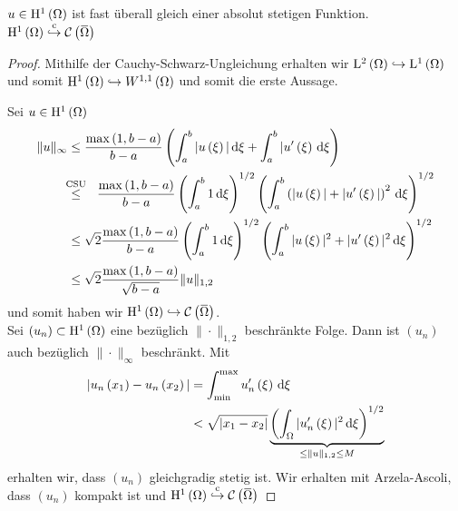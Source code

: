 \begin{lemma}[Satz]
	$u\in\mathrm{H}^{1}\left(\Omega\right)$ ist fast überall gleich einer absolut stetigen Funktion.\\
	$\H^{1}\left(\W\right)\cembed\C\left(\overbar{\W}\right)$
\end{lemma}
\begin{proof}
	Mithilfe der Cauchy-Schwarz-Ungleichung erhalten wir $\mathrm{L}^{2}\left(\Omega\right)\hookrightarrow\mathrm{L}^{1}\left(\Omega\right)$ und somit $\mathrm{H}^{1}\left(\Omega\right)\hookrightarrow W^{1,1}\left(\Omega\right)$ und somit die erste Aussage.
	
	Sei $u\in\mathrm{H}^{1}\left(\Omega\right)${}
	\begin{align*}
		\|u\|_{\infty} &\leq \frac{\operatorname{max}\left(1,b-a\right)}{b-a}\left(\int_{a}^{b}|u\left(\xi\right)|\d\xi + \int_{a}^{b}|u^{\prime}\left(\xi\right)\d\xi\right)\\
		&\overset{\mathclap{\text{CSU}}}{\leq} \hspace*{1em} \frac{\operatorname{max}\left(1,b-a\right)}{b-a}\left(\int_{a}^{b}1\d\xi\right)^{1/2}\left(\int_{a}^{b}\left(|u\left(\xi\right)|+|u^{\prime}\left(\xi\right)|\right)^{2}\d\xi\right)^{1/2}\\
		&\leq \sqrt{2}\frac{\operatorname{max}\left(1,b-a\right)}{b-a}\left(\int_{a}^{b}1\d\xi\right)^{1/2}\left(\int_{a}^{b}|u\left(\xi\right)|^{2}+|u^{\prime}\left(\xi\right)|^{2}\d\xi\right)^{1/2}\\
		&\leq \sqrt{2}\frac{\operatorname{max}\left(1,b-a\right)}{\sqrt{b-a}}\|u\|_{1,2}
	\end{align*}
	und somit haben wir $\H^{1}\left(\W\right)\hookrightarrow \C\left(\overbar{\W}\right)$.\\
	Sei $\left(u_{n}\right)\subset\mathrm{H}^{1}\left(\Omega\right)$ eine bezüglich $\|\cdot\|_{1,2}$ beschränkte Folge. Dann ist $\left(u_{n}\right)$ auch bezüglich $\|\cdot\|_{\infty}$ beschränkt. Mit
	\begin{align*}
		|u_{n}\left(x_{1}\right)-u_{n}\left(x_{2}\right)| &= \int_{\operatorname{min}}^{\operatorname{max}}u^{\prime}_{n}\left(\xi\right)\,\mathrm{d}\xi\\
			&< \sqrt{|x_{1}-x_{2}|}\underbrace{\left(\int_{\Omega}|u^{\prime}_{n}\left(\xi\right)|^{2}\,\mathrm{d}\xi\right)^{1/2}}_{\leq \|u\|_{1,2} \leq M}
	\end{align*}
	erhalten wir, dass $\left(u_{n}\right)$ gleichgradig stetig ist. Wir erhalten mit Arzela-Ascoli, dass $\left(u_{n}\right)$ kompakt ist und $\H^{1}\left(\W\right)\cembed\C\left(\overbar{\W}\right)$
\end{proof}

